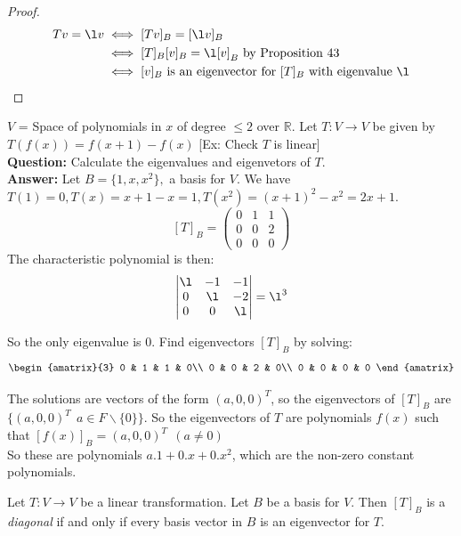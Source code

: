 \documentclass[10pt]{scrartcl}
\begin{document}
\begin{proof}
\[
\begin{aligned}
Tv = \l v & \iff [Tv]_B = [\l v]_B\\
& \iff [T]_B[v]_B = \l[v]_B \text{ by Proposition 43}\\
& \iff [v]_B \text{ is an eigenvector for } [T]_B \text{ with eigenvalue } \l
\end{aligned}\]
\end{proof}


\begin{example} $V$ = Space of polynomials in $x$ of degree $\leq 2$ over $\mathbb{R}$. Let $T: V \to V$ be given by $T(f(x)) = f(x+1) - f(x)$ [Ex: Check $T$ is linear]\\

\textbf{Question:} Calculate the eigenvalues and eigenvetors of $T$.\\

\textbf{Answer:} Let $B = \{1,x,x^2\},$ a basis for $V$. We have $T(1) = 0, T(x) = x+1 -x = 1, T(x^2) = (x+1)^2 - x^2 = 2x+1$.
\[[T]_B = \begin{pmatrix}
0 & 1 & 1 \\ 0 & 0 & 2 \\ 0 & 0 & 0
\end{pmatrix}
\] The characteristic polynomial is then:
\[
\begin{vmatrix}
\l & -1 & -1 \\ 0 & \l & -2 \\ 0 & 0 & \l
\end{vmatrix} = \l^3 \]

So the only eigenvalue is 0. Find eigenvectors $[T]_B$ by solving: 
\[\begin{amatrix}{3}
0 & 1 & 1 & 0\\
0 & 0 & 2 & 0\\
0 & 0 & 0 & 0
\end{amatrix}
\]

The solutions are vectors of the form $(a,0,0)^T$, so the eigenvectors of $[T]_B$ are $\{(a,0,0)^T ~~ a \in F\backslash \{0\} \}$. So the eigenvectors of $T$ are polynomials $f(x)$ such that $[f(x)]_B =  (a,0,0)^T ~~(a \neq 0)$\\

So these are polynomials $a.1 + 0.x + 0.x^2$, which are the non-zero constant polynomials.\end{example}

\begin{proposition} Let $T: V \to V$ be a linear transformation. Let $B$ be a basis for $V$. Then $[T]_B$ is a \emph{diagonal} if and only if every basis vector in $B$ is an eigenvector for $T$.	
\end{proposition}
\end{document}
